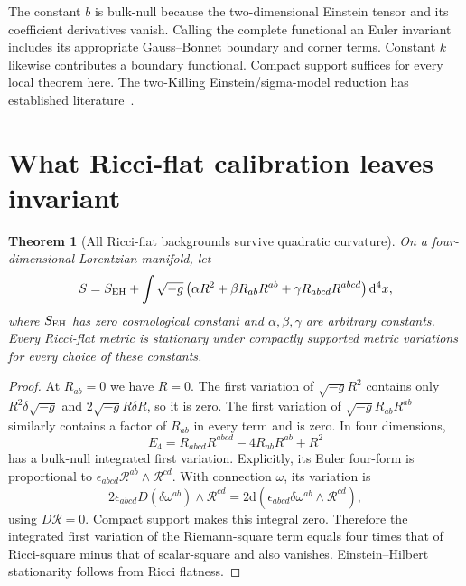 \documentclass[11pt]{article}
\newtheorem{theorem}{Theorem}[section]
\newcommand{\dd}{\mathrm d}
\begin{document}
The constant $b$ is bulk-null because the two-dimensional Einstein tensor and its coefficient derivatives vanish. Calling the complete functional an Euler invariant includes its appropriate Gauss--Bonnet boundary and corner terms. Constant $k$ likewise contributes a boundary functional. Compact support suffices for every local theorem here. The two-Killing Einstein/sigma-model reduction has established literature~\cite{Cruz,Grumiller}.

\section{What Ricci-flat calibration leaves invariant}\label{sec:quadratic}

\begin{theorem}[All Ricci-flat backgrounds survive quadratic curvature]
On a four-dimensional Lorentzian manifold, let
\begin{equation}
 S=S_{\rm EH}+\int\sqrt{-g}\left(\alpha R^2+\beta R_{ab}R^{ab}+\gamma R_{abcd}R^{abcd}\right)\dd^4x,
\end{equation}
where $S_{\rm EH}$ has zero cosmological constant and $\alpha,\beta,\gamma$ are arbitrary constants. Every Ricci-flat metric is stationary under compactly supported metric variations for every choice of these constants.
\end{theorem}
\begin{proof}
At $R_{ab}=0$ we have $R=0$. The first variation of $\sqrt{-g}R^2$ contains only $R^2\delta\sqrt{-g}$ and $2\sqrt{-g}R\delta R$, so it is zero. The first variation of $\sqrt{-g}R_{ab}R^{ab}$ similarly contains a factor of $R_{ab}$ in every term and is zero. In four dimensions,
\begin{equation}
 E_4=R_{abcd}R^{abcd}-4R_{ab}R^{ab}+R^2
\end{equation}
has a bulk-null integrated first variation. Explicitly, its Euler four-form is proportional to $\epsilon_{abcd}\mathcal R^{ab}\wedge\mathcal R^{cd}$. With connection $\omega$, its variation is
\begin{equation}
 2\epsilon_{abcd}D(\delta\omega^{ab})\wedge\mathcal R^{cd}
 =2\dd\left(\epsilon_{abcd}\delta\omega^{ab}\wedge\mathcal R^{cd}\right),
\end{equation}
using $D\mathcal R=0$. Compact support makes this integral zero. Therefore the integrated first variation of the Riemann-square term equals four times that of Ricci-square minus that of scalar-square and also vanishes. Einstein--Hilbert stationarity follows from Ricci flatness.
\end{proof}
\end{document}
